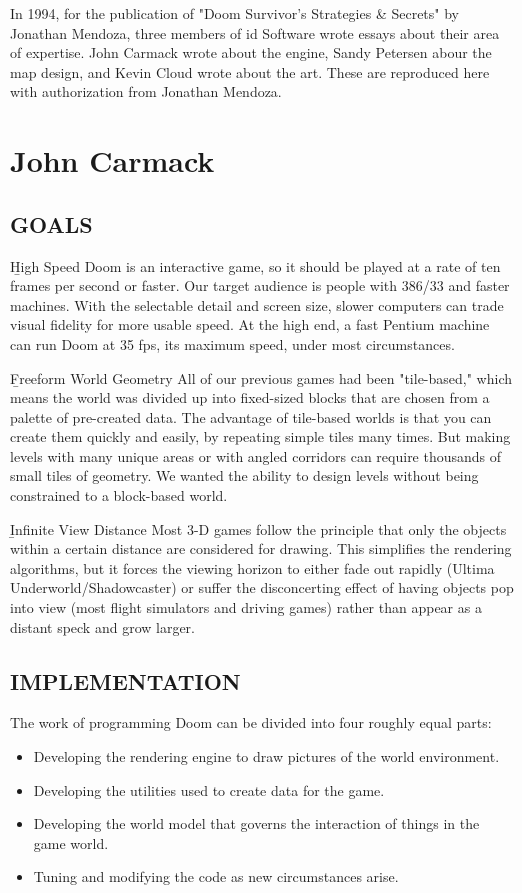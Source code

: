 In 1994, for the publication of "Doom Survivor's Strategies \& Secrets" by Jonathan Mendoza, three members of id Software wrote essays about their area of expertise. John Carmack wrote about the engine, Sandy Petersen abour the map design, and Kevin Cloud wrote about the art. These are reproduced here with authorization from Jonathan Mendoza.\\
\par
\section{John Carmack}
\subsection{GOALS}
\b{High Speed} Doom is an interactive game, so it should be played at a rate of ten frames per second or faster. Our target audience is people with 386/33 and faster machines. With the selectable detail and screen size, slower computers can trade visual fidelity for more usable speed. At the high end, a fast Pentium machine can run Doom at 35 fps, its maximum speed, under most circumstances.\\
\par

\b{Freeform World Geometry} All of our previous games had been "tile-based," which means the world was divided up into fixed-sized blocks that are chosen from a palette of pre-created data. The advantage of tile-based worlds is that you can create them quickly and easily, by repeating simple tiles many times. But making levels with many unique areas or with angled corridors can require thousands of small tiles of geometry. We wanted the ability to design levels without being constrained to a block-based world.\\
\par 
\b{Infinite View Distance} Most 3-D games
follow the principle that only the objects within a certain distance are considered for drawing.
This simplifies the rendering algorithms, but it forces the viewing horizon to either fade out rapidly (Ultima Underworld/Shadowcaster) or suffer the disconcerting effect of having objects pop into view (most flight simulators and driving games) rather than appear as a distant speck and grow larger.
\par
\subsection{IMPLEMENTATION}
The work of programming Doom can be divided into four roughly
equal parts:
\begin{itemize}
\item Developing the rendering engine
to draw pictures
of the world
environment.
\item Developing the utilities used to create data for the game.
\item Developing the world model that governs
the interaction of
things in the game world.
\item Tuning and modifying
the code as new circumstances arise.
\end{itemize}

